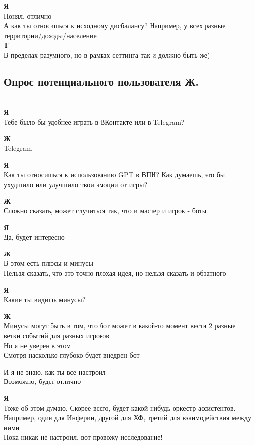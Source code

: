 \textbf{Я}\\
Понял, отлично\\
А как ты относишься к исходному дисбалансу? Например, у всех разные территории/доходы/население\\

\textbf{Т}\\
В пределах разумного, но в рамках сеттинга так и должно быть же)\\

\subsection*{Опрос потенциального пользователя Ж.}\\
\textbf{Я}\\
Тебе было бы удобнее играть в ВКонтакте или в Telegram?

\textbf{Ж}\\
Telegram

\textbf{Я}\\
Как ты относишься к использованию GPT в ВПИ? Как думаешь, это бы ухудшило или улучшило твои эмоции от игры?

\textbf{Ж}\\
Сложно сказать, может случиться так, что и мастер и игрок - боты

\textbf{Я}\\
Да, будет интересно

\textbf{Ж}\\
В этом есть плюсы и минусы\\
Нельзя сказать, что это точно плохая идея, но нельзя сказать и обратного

\textbf{Я}\\
Какие ты видишь минусы?

\textbf{Ж}\\
Минусы могут быть в том, что бот может в какой-то момент вести 2 разные ветки событий для разных игроков\\
Но я не уверен в этом\\
Смотря насколько глубоко будет внедрен бот

И я не знаю, как ты все настроил\\
Возможно, будет отлично

\textbf{Я}\\
Тоже об этом думаю. Скорее всего, будет какой-нибудь оркестр ассистентов. Например, один для Инферии, другой для ХФ, третий для взаимодействия между ними\\
Пока никак не настроил, вот провожу исследование!


